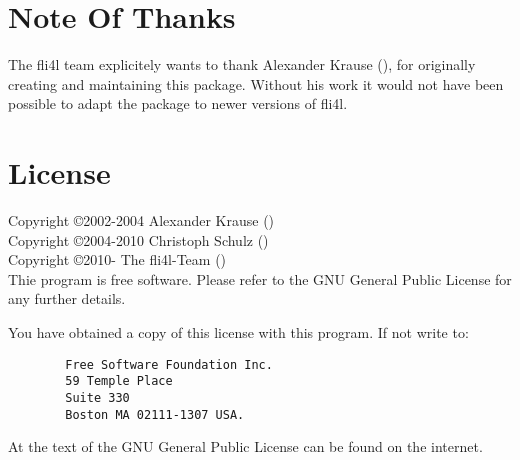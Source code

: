 \section{Note Of Thanks}

The fli4l team explicitely wants to thank Alexander Krause
(), for originally creating and maintaining
this package. Without his work it would not have been possible to adapt
the package to newer versions of fli4l.

\section{License}

Copyright \copyright  2002-2004 Alexander Krause () \\
Copyright \copyright  2004-2010 Christoph Schulz () \\
Copyright \copyright  2010-     The fli4l-Team () \\

Thie program is free software. Please refer to the GNU General Public License
for any further details.

You have obtained a copy of this license with this program. If not write to:

\begin{verbatim}
		Free Software Foundation Inc.
		59 Temple Place
		Suite 330
		Boston MA 02111-1307 USA.
\end{verbatim}

At  the text of the GNU General
Public License can be found on the internet.